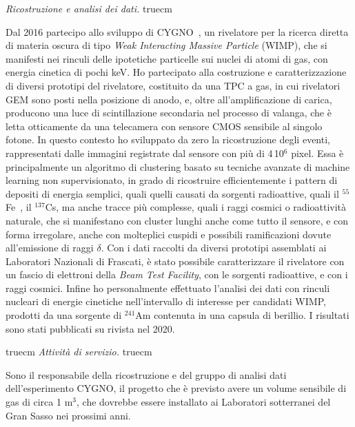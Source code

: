 \documentclass[11pt,twoside,a4paper]{article}
\begin{document}
\textit{Ricostruzione e analisi dei dati.}
 truecm

Dal 2016 partecipo allo sviluppo di CYGNO~\cite{Pinci:2019hhw}, un
rivelatore per la ricerca diretta di materia oscura di tipo
\textit{Weak Interacting Massive Particle} (WIMP), che si manifesti
nei rinculi delle ipotetiche particelle sui nuclei di atomi di gas,
con energia cinetica di pochi keV. Ho partecipato alla costruzione e
caratterizzazione di diversi prototipi del rivelatore, costituito da
una TPC a gas, in cui rivelatori GEM sono posti nella posizione di
anodo, e, oltre all'amplificazione di carica, producono una luce di
scintillazione secondaria nel processo di valanga, che \`e letta
otticamente da una telecamera con sensore CMOS sensibile al singolo
fotone.  In questo contesto ho sviluppato da zero la ricostruzione
degli eventi, rappresentati dalle immagini registrate dal sensore con
pi\`u di 4\,10$^6$ pixel.  Essa \`e principalmente un algoritmo di
clustering basato su tecniche avanzate di machine learning non
supervisionato, in grado di ricostruire efficientemente i pattern di
depositi di energia semplici, quali quelli causati da sorgenti
radioattive, quali il $^{55}$Fe~\cite{Costa_2019}, il $^{137}$Cs, ma
anche tracce pi\`u complesse, quali i raggi cosmici o radioattivit\`a
naturale, che si manifestano con cluster lunghi anche come tutto il
sensore, e con forma irregolare, anche con molteplici cuspidi e
possibili ramificazioni dovute all'emissione di raggi $\delta$.  Con i
dati raccolti da diversi prototipi assemblati ai Laboratori Nazionali
di Frascati, \`e stato possibile caratterizzare il rivelatore con un
fascio di elettroni della \textit{Beam Test Facility}, con le sorgenti
radioattive, e con i raggi cosmici. Infine ho personalmente effettuato
l'analisi dei dati con rinculi nucleari di energie cinetiche
nell'intervallo di interesse per candidati WIMP, prodotti da una
sorgente di $^{241}$Am contenuta in una capsula di berillio. I
risultati sono stati pubblicati su rivista nel 2020.

 truecm
\textit{Attivit\`a di servizio.}
 truecm

Sono il responsabile della ricostruzione e del gruppo di analisi dati
dell'esperimento CYGNO, il progetto che \`e previsto avere un volume
sensibile di gas di circa 1 m$^3$, che dovrebbe essere installato ai
Laboratori sotterranei del Gran Sasso nei prossimi anni.

\clearpage

\nocite{*}


\end{document}

